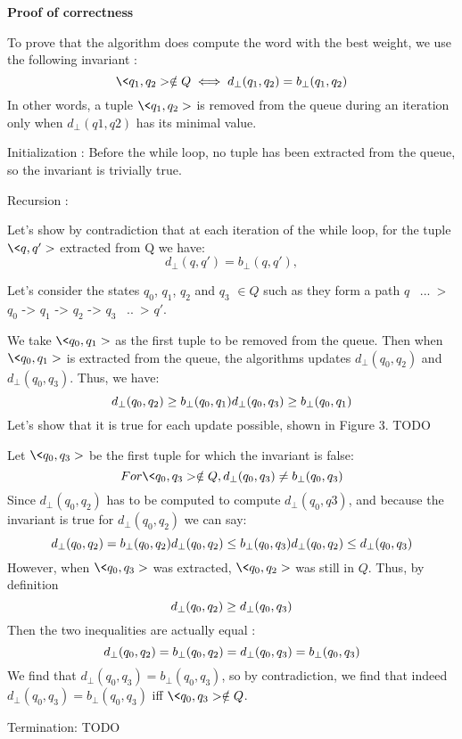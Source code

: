 \textbf{Proof of correctness}

To prove that the algorithm does compute the word with the best weight, we use the following invariant :
$$
\<q_1, q_2> \notin Q \iff d_{\bot}(q_1, q_2) = b_{\bot}(q_1, q_2)
$$
In other words, a tuple $\<q_1, q_2>$ is removed from the queue during an iteration only when $d_{\bot}(q1, q2)$ has its minimal value.

Initialization : Before the while loop, no tuple has been extracted from the queue, so the invariant is trivially true.

Recursion : 

Let's show by contradiction that at each iteration of the while loop, for the tuple $\<q, q'>$ extracted from Q we have:
$$
d_{\bot}(q, q') = b_{\bot}(q, q'), 
$$


Let's consider the states $q_0$, $q_1$, $q_2$ and $q_3$ $\in Q$ such as they form a path $q$ ~...~>$q_0$ -> $q_1$ -> $q_2$ -> $q_3$ ~..~> $q'$.

We take $\<q_0, q_1>$ as the first tuple to be removed from the queue. Then when $\<q_0, q_1>$ is extracted from the queue, the algorithms updates $d_{\bot}(q_0, q_2)$ and $d_{\bot}(q_0, q_3)$. Thus, we have:
$$
d_{\bot}(q_0, q_2) \geq b_{\bot}(q_0, q_1) \\
d_{\bot}(q_0, q_3) \geq b_{\bot}(q_0, q_1)
$$
Let's show that it is true for each update possible, shown in Figure 3. TODO

Let $\<q_0, q_3>$ be the first tuple for which the invariant is false:
$$
For \<q_0, q_3> \notin Q, d_{\bot} (q_0, q_3) \neq b_{\bot} (q_0, q_3)
$$
Since $d_{\bot}(q_0, q_2)$ has to be computed to compute $d_{\bot}(q_0, q3)$, and because the invariant is true for  $d_{\bot}(q_0, q_2)$ we can say:
$$
d_{\bot}(q_0, q_2) = b_{\bot}(q_0, q_2) \\
d_{\bot}(q_0, q_2) \leq b_{\bot}(q_0, q_3) \\
\\d_{\bot}(q_0, q_2) \leq d_{\bot}(q_0, q_3) \\
$$
 However, when $\<q_0, q_3>$ was extracted, $\<q_0, q_2>$ was still in $Q$. Thus, by definition 
$$
d_{\bot}(q_0, q_2) \geq d_{\bot}(q_0, q_3) \\
$$
Then the two inequalities are actually equal : 
$$
d_{\bot}(q_0, q_2) = b_{\bot}(q_0, q_2) = d_{\bot}(q_0, q_3) = b_{\bot}(q_0, q_3) \\
$$
We find that $d_{\bot}(q_0, q_3) = b_{\bot}(q_0, q_3)$, so by contradiction, we find that indeed $d_{\bot}(q_0, q_3) = b_{\bot}(q_0, q_3)$ iff 
$\<q_0, q_3> \notin Q$.


Termination: TODO 